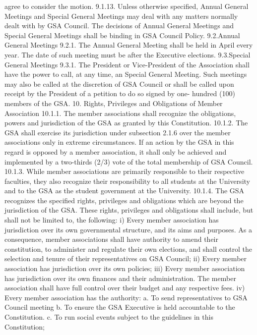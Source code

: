 \documentclass{article}
\begin{document}
agree to consider the motion. 
9.1.13. Unless otherwise specified, Annual General Meetings and Special 
General Meetings may deal with any matters normally dealt with by 
GSA Council. The decisions of Annual General Meetings and Special 
General Meetings shall be binding in GSA Council Policy. 
9.2.Annual General Meetings 
9.2.1. The Annual General Meeting shall be held in April every year. The 
date of such meeting must be after the Executive elections. 
9.3.Special General Meetings 
9.3.1. The President or Vice-President of the Association shall have the 
power to call, at any time, an Special General Meeting. Such meetings 
may also be called at the discretion of GSA Council or shall be called 
upon receipt by the President of a petition to do so signed by one- 
hundred (100) members of the GSA. 
10. Rights, Privileges and Obligations of Member Association 
10.1.1. The member associations shall recognize the obligations, powers 
and jurisdiction of the GSA as granted by this Constitution. 
10.1.2. The GSA shall exercise its jurisdiction under subsection 2.1.6 over 
the member associations only in extreme circumstances. If an action 
by the GSA in this regard is opposed by a member association, it shall 
only be achieved and implemented by a two-thirds (2/3) vote of the 
total membership of GSA Council. 
10.1.3. While member associations are primarily responsible to their 
respective faculties, they also recognize their responsibility to all 
students at the University and to the GSA as the student government at 
the University. 
10.1.4. The GSA recognizes the specified rights, privileges and obligations 
which are beyond the jurisdiction of the GSA. These rights, privileges 
and obligations shall include, but shall not be limited to, the following: 
i) Every member association has jurisdiction over its own governmental 
structure, and its aims and purposes. As a consequence, member 
associations shall have authority to amend their constitution, to 
administer and regulate their own elections, and shall control the 
selection and tenure of their representatives on GSA Council; 
ii) Every member association has jurisdiction over its own policies; 
iii) Every member association has jurisdiction over its own finances and 
their administration. The member association shall have full control 
over their budget and any respective fees. 
iv) Every member association has the authority: 
a. To send representatives to GSA Council meeting 
b. To ensure the GSA Executive is held accountable to the 
 Constitution. 
c. To run social events subject to the guidelines in this Constitution; 
\end{document}
